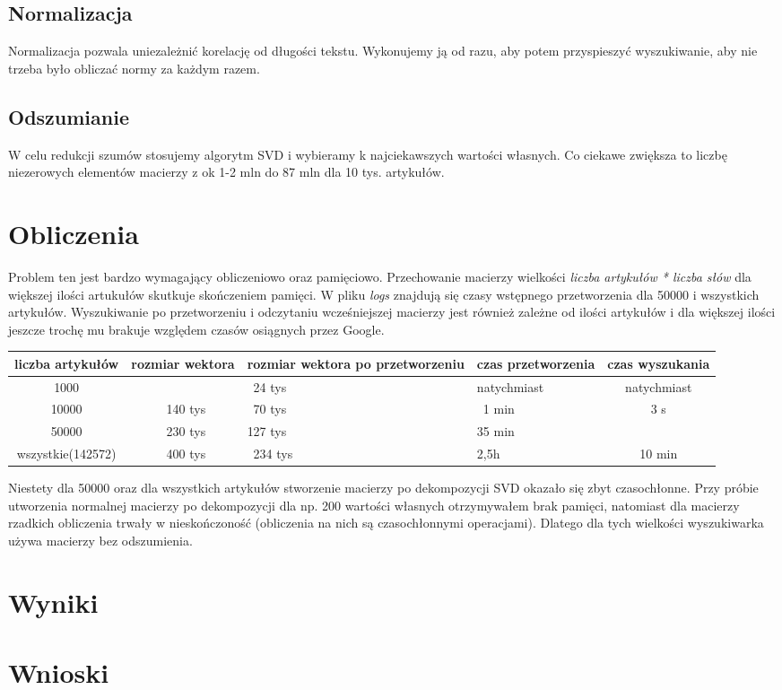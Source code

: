 \documentclass{article}
\begin{document}
\subsection{Normalizacja}
Normalizacja pozwala uniezależnić korelację od długości tekstu. Wykonujemy ją od razu, aby potem przyspieszyć wyszukiwanie, aby nie trzeba było obliczać normy za każdym razem.
\subsection{Odszumianie}
W celu redukcji szumów stosujemy algorytm SVD i wybieramy k najciekawszych wartości własnych. Co ciekawe zwiększa to liczbę niezerowych elementów macierzy z ok 1-2 mln do 87 mln dla 10 tys. artykułów.

\section{Obliczenia}
Problem ten jest bardzo wymagający obliczeniowo oraz pamięciowo. Przechowanie macierzy wielkości \textit{liczba artykułów * liczba słów} dla większej ilości artukułów skutkuje skończeniem pamięci. W pliku \textit{logs} znajdują się czasy wstępnego przetworzenia dla 50000 i wszystkich artykułów. Wyszukiwanie po przetworzeniu i odczytaniu wcześniejszej macierzy jest również zależne od ilości artykułów i dla większej ilości jeszcze trochę mu brakuje względem czasów osiągnych przez Google.

\begin{center}
	\begin{tabular}{c|c|p{1.5cm}|p{1.6cm}|c}
	\centering liczba artykułów & rozmiar wektora & rozmiar wektora po przetworzeniu & czas przetworzenia & czas wyszukania \\ \hline
	1000 &  & ~24 tys & natychmiast & natychmiast\\ \hline
	10000 & ~140 tys & ~70 tys & ~1 min & 3 s\\ \hline
	50000 & ~230 tys & 127 tys & 35 min & \\ \hline
	wszystkie(142572) & ~400 tys & ~234 tys & 2,5h & 10 min\\
	\end{tabular}
\end{center}

Niestety dla 50000 oraz dla wszystkich artykułów stworzenie macierzy po dekompozycji SVD okazało się zbyt czasochłonne. Przy próbie utworzenia normalnej macierzy po dekompozycji dla np. 200 wartości własnych otrzymywałem brak pamięci, natomiast dla macierzy rzadkich obliczenia trwały w nieskończoność (obliczenia na nich są czasochłonnymi operacjami). Dlatego dla tych wielkości wyszukiwarka używa macierzy bez odszumienia.

\section{Wyniki}


\section{Wnioski}
\end{document}
